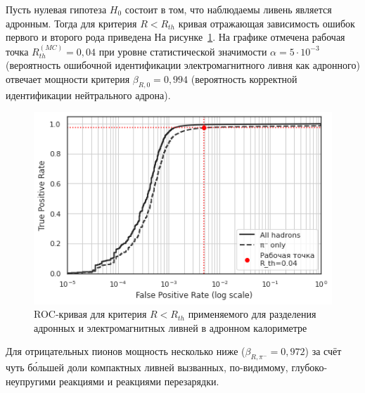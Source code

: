 Пусть нулевая гипотеза $H_0$ состоит в том, что наблюдаемы ливень
является адронным. Тогда для критерия $R < R_{th}$ кривая
отражающая зависимость ошибок первого и второго рода приведена
На рисунке~\ref{fig:roc-curve-rfac}. На графике отмечена рабочая точка
$R_{th}^{(MC)} = 0{,}04$ при уровне статистической значимости
$\alpha=5\cdot10^{-3}$ (вероятность ошибочной идентификации
электромагнитного ливня как адронного) отвечает мощности
критерия $\beta_{R,0} = 0{,}994$
(вероятность корректной идентификации нейтрального адрона).
\begin{figure}[ht]
    \centering
    \includegraphics[width=0.65\linewidth]{images//r-simulations/roc-curve.png}
    \caption{ROC-кривая для критерия $R < R_{th}$ применяемого для разделения
    адронных и электромагнитных ливней в адронном калориметре}
    \label{fig:roc-curve-rfac}
\end{figure}
Для отрицательных пионов мощность несколько
ниже ($\beta_{R,\pi^{-}} = 0{,}972$) за счёт чуть б\'ольшей доли
компактных ливней вызванных, по-видимому, глубоко-неупругими реакциями
и реакциями перезарядки.

